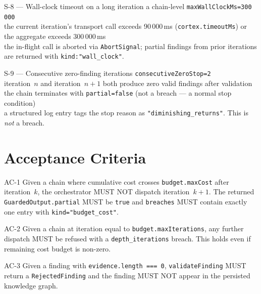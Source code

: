 \begin{scenario}{S-8 --- Wall-clock timeout on a long iteration}
\Given a chain-level \texttt{maxWallClockMs=300\,000} \\
\When the current iteration's transport call exceeds 90\,000\,ms (\texttt{cortex.timeoutMs}) or the aggregate exceeds 300\,000\,ms \\
\Then the in-flight call is aborted via \texttt{AbortSignal}; partial findings from prior iterations are returned with \texttt{kind:"wall\_clock"}.
\end{scenario}

\begin{scenario}{S-9 --- Consecutive zero-finding iterations}
\Given \texttt{consecutiveZeroStop=2} \\
\When iteration~$n$ and iteration~$n{+}1$ both produce zero valid findings after validation \\
\Then the chain terminates with \texttt{partial=false} (not a breach --- a normal stop condition) \\
\And a structured log entry tags the stop reason as \texttt{"diminishing\_returns"}. This is \emph{not} a breach.
\end{scenario}

\section{Acceptance Criteria}

\begin{ac}{AC-1}
Given a chain where cumulative cost crosses \texttt{budget.maxCost} after iteration~$k$, the orchestrator MUST NOT dispatch iteration~$k{+}1$. The returned \texttt{GuardedOutput.partial} MUST be \texttt{true} and \texttt{breaches} MUST contain exactly one entry with \texttt{kind="budget\_cost"}.
\end{ac}

\begin{ac}{AC-2}
Given a chain at iteration equal to \texttt{budget.maxIterations}, any further dispatch MUST be refused with a \texttt{depth\_iterations} breach. This holds even if remaining cost budget is non-zero.
\end{ac}

\begin{ac}{AC-3}
Given a finding with \texttt{evidence.length === 0}, \texttt{validateFinding} MUST return a \texttt{RejectedFinding} and the finding MUST NOT appear in the persisted knowledge graph.
\end{ac}


